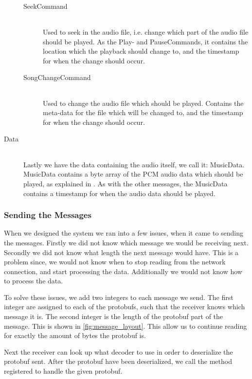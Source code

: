 \begin{description}
\begin{description}
            \item[SeekCommand] \hfill\\
                Used to seek in the audio file, i.e. change which part of the audio file should be played.
                As the Play- and PauseCommands, it contains the location which the playback should change to, and the timestamp for when the change should occur.
            \item[SongChangeCommand] \hfill\\
                Used to change the audio file which should be played.
                Contains the meta-data for the file which will be changed to, and the timestamp for when the change should occur.
        \end{description}

    \item[Data] \hfill \\
        Lastly we have the data containing the audio itself, we call it: MusicData.
        MusicData contains a byte array of the \ac{PCM} audio data which should be played, as explained in .
        As with the other messages, the MusicData contains a timestamp for when the audio data should be played.
\end{description}

\subsubsection*{Sending the Messages}
When we designed the system we ran into a few issues, when it came to sending the messages.
Firstly we did not know which message we would be receiving next.
Secondly we did not know what length the next message would have.
This is a problem since, we would not know when to stop reading from the network connection, and start processing the data.
Additionally we would not know how to process the data.

To solve these issues, we add two integers to each message we send.
The first integer are assigned to each of the protobufs, such that the receiver knows which message it is.
The second integer is the length of the protobuf part of the message.
This is shown in \cref{fig:message_layout}.
This allow us to continue reading for exactly the amount of bytes the protobuf is.

Next the receiver can look up what decoder to use in order to deserialize the protobuf sent.
After the protobuf have been deserialized, we call the method registered to handle the given protobuf. 

